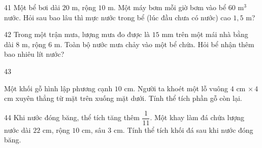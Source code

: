\gap
\begin{probbox}{41}{}
Một bể bơi dài $20$ m, rộng $10$ m. Một máy bơm mỗi giờ bơm vào bể $60$ m$^3$ nước. Hỏi sau bao lâu thì mực nước trong bể (lúc đầu chưa có nước) cao $1{,}5$ m?
\end{probbox}
\gap
\begin{probbox}{42}{}
Trong một trận mưa, lượng mưa đo được là $15$ mm trên một mái nhà bằng dài $8$ m, rộng $6$ m. Toàn bộ nước mưa chảy vào một bể chứa. Hỏi bể nhận thêm bao nhiêu lít nước?
\end{probbox}
\gap
\begin{probbox}{43}{}
\begin{minipage}[t]{0.6\linewidth}
Một khối gỗ hình lập phương cạnh $10$ cm. Người ta khoét một lỗ vuông $4$ cm $\times\,4$ cm xuyên thẳng từ mặt trên xuống mặt dưới. Tính thể tích phần gỗ còn lại.
\end{minipage}\hfill
\begin{minipage}[t]{0.36\linewidth}\vspace{0pt}\centering
{}
\end{minipage}
\end{probbox}
\gap
\begin{probbox}{44}{}
Khi nước đóng băng, thể tích tăng thêm $\dfrac1{11}$. Một khay làm đá chứa lượng nước dài $22$ cm, rộng $10$ cm, sâu $3$ cm. Tính thể tích khối đá sau khi nước đóng băng.
\end{probbox}
